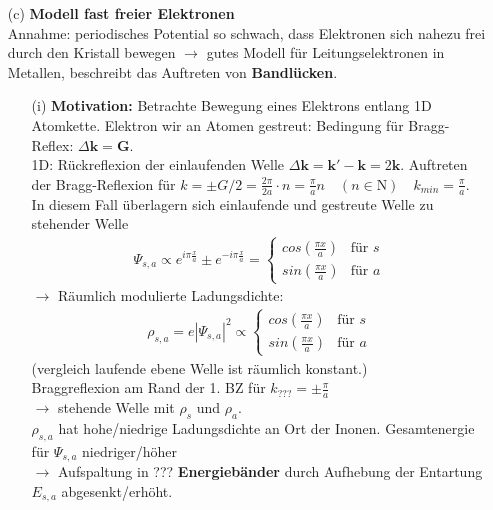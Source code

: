 \begin{itemize}
    \item[(c)] \textbf{Modell fast freier Elektronen} \\
    Annahme: periodisches Potential so schwach, dass Elektronen sich nahezu frei durch den Kristall bewegen $\rightarrow$ gutes Modell für Leitungselektronen in Metallen, beschreibt das Auftreten von \textbf{Bandlücken}.
    \begin{itemize}
        \item[(i)] \textbf{Motivation:} Betrachte Bewegung eines Elektrons entlang 1D Atomkette. Elektron wir an Atomen gestreut: Bedingung für Bragg-Reflex: $\Delta \textbf{k} = \textbf{G}$. \\
        1D: Rückreflexion der einlaufenden Welle $\Delta \textbf{k} =  \textbf{k}' -  \textbf{k} = 2 \textbf{k} $. Auftreten der Bragg-Reflexion für $k = \pm G/2 = \frac{2\pi}{2a}\cdot n = \frac{\pi}{a} n \quad (n \in \mathrm{N}) \quad k_{min} = \frac{\pi}{a}$. \\
        In diesem Fall überlagern sich einlaufende und gestreute Welle zu stehender Welle
        \begin{align}
            \Psi_{s,a} \propto e^{i\pi \frac{x}{a}} \pm e^{-i\pi \frac{x}{a}} = \begin{cases}
                cos(\frac{\pi x}{a}) & \text{für } s \\
                sin(\frac{\pi x}{a}) & \text{für } a 
            \end{cases}
        \end{align}
        $\rightarrow$ Räumlich modulierte Ladungsdichte:
        \begin{align}
            \rho_{s,a} = e \left|\Psi_{s,a}\right|^2 \propto \begin{cases}
                cos(\frac{\pi x}{a}) & \text{für } s \\
                sin(\frac{\pi x}{a}) & \text{für } a 
            \end{cases}
        \end{align}
        (vergleich laufende ebene Welle ist räumlich konstant.)\\
        Braggreflexion am Rand der 1. BZ für $k_{???} = \pm \frac{\pi}{a}$\\
            $\rightarrow$ stehende Welle mit $\rho_s$ und $\rho_a$.\\
            $\rho_{s,a}$ hat hohe/niedrige Ladungsdichte an Ort der Inonen. Gesamtenergie für $\Psi_{s,a}$ niedriger/höher\\
            $\rightarrow$ Aufspaltung in ??? \textbf{Energiebänder} durch Aufhebung der Entartung $E_{s,a}$ abgesenkt/erhöht.  

\end{itemize}
\end{itemize}
